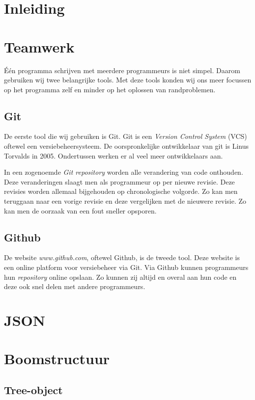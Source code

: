 \section{Inleiding}

\section{Teamwerk}
Één programma schrijven met meerdere programmeurs is niet simpel. Daarom gebruiken wij twee belangrijke tools. Met deze tools konden wij ons meer focussen op het programma zelf en minder op het oplossen van randproblemen.

\subsection{Git}
De eerste tool die wij gebruiken is Git.
Git is een \textit{Version Control System} (VCS) oftewel een versiebeheersysteem. De oorspronkelijke ontwikkelaar van git is Linus Torvalds in 2005.\cite{git:init} Ondertussen werken er al veel meer ontwikkelaars aan.

In een zogenoemde \textit{Git repository} worden alle verandering van code onthouden. Deze veranderingen slaagt men als programmeur op per nieuwe revisie. Deze revisies worden allemaal bijgehouden op chronologische volgorde. Zo kan men teruggaan naar een vorige revisie en deze vergelijken met de nieuwere revisie. Zo kan men de oorzaak van een fout sneller opsporen.

\subsection{Github}
De website \textit{www.github.com}, oftewel Github, is de tweede tool.
Deze website is een online platform voor versiebeheer via Git. Via Github kunnen programmeurs hun \textit{repository} online opslaan.\cite{git:hello_world} Zo kunnen zij altijd en overal aan hun code en deze ook snel delen met andere programmeurs.

\clearpage
\section{JSON}



\section{Boomstructuur}
\subsection{Tree-object}

